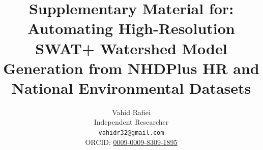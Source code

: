 \documentclass[12pt]{article}
\title{Supplementary Material for:\\[0.6em]
  {\large Automating High-Resolution SWAT+ Watershed Model Generation from NHDPlus HR and National Environmental Datasets}}
\author{%
  Vahid Rafiei\\
  Independent Researcher\\
  \texttt{vahidr32@gmail.com}\\
  ORCID: \href{https://orcid.org/0009-0009-8309-1895}{0009-0009-8309-1895}
}
\date{}
\begin{document}
\maketitle

\setcounter{section}{0}
\setcounter{table}{0}
\setcounter{figure}{0}
\renewcommand{\thesection}{S\arabic{section}}
\renewcommand{\thetable}{S\arabic{table}}
\renewcommand{\thefigure}{S\arabic{figure}}










\end{document}
